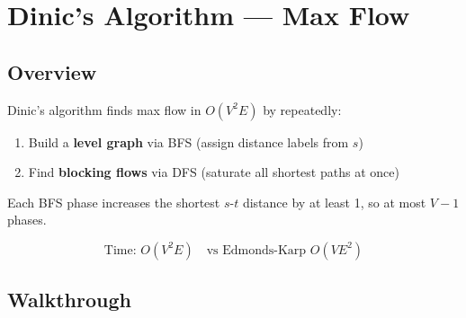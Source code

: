 \section{Dinic's Algorithm --- Max Flow}

\subsection{Overview}

Dinic's algorithm finds max flow in $O(V^2 E)$ by repeatedly:
\begin{enumerate}
\item Build a \textbf{level graph} via BFS (assign distance labels from $s$)
\item Find \textbf{blocking flows} via DFS (saturate all shortest paths at once)
\end{enumerate}

Each BFS phase increases the shortest $s$-$t$ distance by at least 1, so at most $V-1$ phases.

$$\text{Time: } O(V^2 E) \quad \text{vs Edmonds-Karp } O(VE^2)$$

\subsection{Walkthrough}

